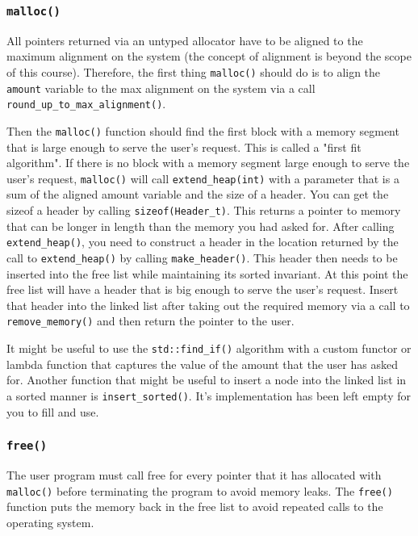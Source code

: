 \documentclass{article}
\begin{document}
\subsubsection{\texttt{malloc()}}
All pointers returned via an untyped allocator have to be aligned to the
maximum alignment on the system (the concept of alignment is beyond the scope
of this course).  Therefore, the first thing \texttt{malloc()} should do is to
align the \texttt{amount} variable to the max alignment on the system via a
call \texttt{round\_up\_to\_max\_alignment()}.

Then the \texttt{malloc()} function should find the first block with a memory
segment that is large enough to serve the user's request.  This is called a
"first fit algorithm".  If there is no block with a memory segment large
enough to serve the user's request, \texttt{malloc()} will call
\texttt{extend\_heap(int)} with a parameter that is a sum of the aligned
amount variable and the size of a header.  You can get the sizeof a header by
calling \texttt{sizeof(Header\_t)}.  This returns a pointer to memory that can
be longer in length than the memory you had asked for.  After calling
\texttt{extend\_heap()}, you need to construct a header in the location
returned by the call to \texttt{extend\_heap()} by calling
\texttt{make\_header()}.  This header then needs to be inserted into the free
list while maintaining its sorted invariant.  At this point the free list will
have a header that is big enough to serve the user's request.  Insert that
header into the linked list after taking out the required memory via a call to
\texttt{remove\_memory()} and then return the pointer to the user.

It might be useful to use the \texttt{std::find\_if()} algorithm with a custom
functor or lambda function that captures the value of the amount that the user
has asked for.  Another function that might be useful to insert a node into
the linked list in a sorted manner is \texttt{insert\_sorted()}.  It's
implementation has been left empty for you to fill and use.

\subsubsection{\texttt{free()}}
The user program must call free for every pointer that it has allocated with
\texttt{malloc()} before terminating the program to avoid memory leaks.  The
\texttt{free()} function puts the memory back in the free list to avoid
repeated calls to the operating system.
\end{document}
